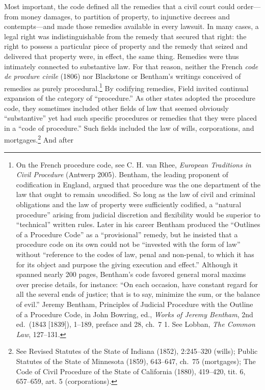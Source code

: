 \documentclass[12pt,]{article}
\let\rmarkdownfootnote\footnote%
\def\footnote{\protect\rmarkdownfootnote}
\begin{document}
Most important, the code defined all the remedies that a civil court
could order---from money damages, to partition of property, to
injunctive decrees and contempts---and made those remedies available in
every lawsuit. In many cases, a legal right was indistinguishable from
the remedy that secured that right: the right to possess a particular
piece of property and the remedy that seized and delivered that property
were, in effect, the same thing. Remedies were thus intimately connected
to substantive law. For that reason, neither the French \emph{code de
procdure civile} (1806) nor Blackstone or Bentham's writings conceived
of remedies as purely procedural.\footnote{On the French procedure code,
  see C. H. van Rhee, \emph{European Traditions in Civil Procedure}
  (Antwerp 2005). Bentham, the leading proponent of codification in
  England, argued that procedure was the one department of the law that
  ought to remain \emph{un}codified. So long as the law of civil and
  criminal obligations and the law of property were sufficiently
  codified, a ``natural procedure'' arising from judicial discretion and
  flexibility would be superior to ``technical'' written rules. Later in
  his career Bentham produced the ``Outlines of a Procedure Code'' as a
  ``provisional'' remedy, but he insisted that a procedure code on its
  own could not be ``invested with the form of law'' without ``reference
  to the codes of law, penal and non-penal, to which it has for its
  object and purpose the giving execution and effect.'' Although it
  spanned nearly 200 pages, Bentham's code favored general moral maxims
  over precise details, for instance: ``On each occasion, have constant
  regard for all the several ends of justice; that is to say, minimize
  the sum, or the balance of evil.'' Jeremy Bentham, Principles of
  Judicial Procedure with the Outline of a Procedure Code, in John
  Bowring, ed., \emph{Works of Jeremy Bentham}, 2nd ed.~(1843
  {[}1839{]}), 1--189, preface and 28, ch.~7 1. See Lobban, \emph{The
  Common Law}, 127--131.} By codifying remedies, Field invited continual
expansion of the category of ``procedure.'' As other states adopted the
procedure code, they sometimes included other fields of law that seemed
obviously ``substantive'' yet had such specific procedures or remedies
that they were placed in a ``code of procedure.'' Such fields included
the law of wills, corporations, and mortgages.\footnote{See Revised
  Statutes of the State of Indiana (1852), 2:245--320 (wills); Public
  Statutes of the State of Minnesota (1859), 643--647, ch.~75
  (mortgages); The Code of Civil Procedure of the State of California
  (1880), 419--420, tit. 6, 657--659, art. 5 (corporations).} And after
\end{document}
